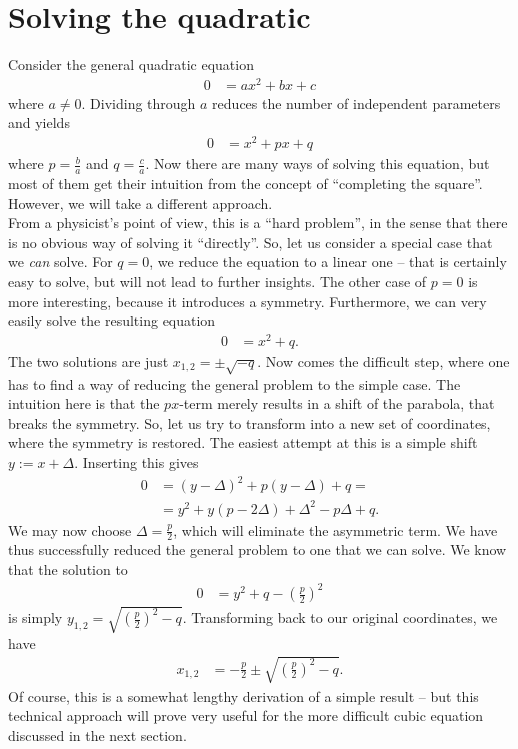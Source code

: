 \documentclass[english, parskip=full]{scrartcl}
\title{\titel}
\author{\autor}
\date{\today}
\newcommand{\kla}{}
\begin{document}
\maketitle  %

\section{Solving the quadratic}
Consider the general quadratic equation
\begin{align}
0 &= ax^2+bx+c
\end{align}
where $a\neq 0$.
Dividing through $a$ reduces the number of independent parameters and yields
\begin{align}
0 &= x^2 + px + q
\end{align} 
where $p=\frac{b}{a}$ and $q=\frac{c}{a}$.
Now there are many ways of solving this equation, but most of them get their intuition from the concept of ``completing the square''.
However, we will take a different approach.
\\
From a physicist's point of view, this is a ``hard problem'', in the sense that there is no obvious way of solving it ``directly''.
So, let us consider a special case that we \emph{can} solve.
For $q=0$, we reduce the equation to a linear one -- that is certainly easy to solve, but will not lead to further insights.
The other case of $p=0$ is more interesting, because it introduces a symmetry.
Furthermore, we can very easily solve the resulting equation
\begin{align}
0 &= x^2+q.
\end{align}
The two solutions are just $x_{1,2} = \pm \sqrt{-q}$.
Now comes the difficult step, where one has to find a way of reducing the general problem to the simple case.
The intuition here is that the $px$-term merely results in a shift of the parabola, that breaks the symmetry.
So, let us try to transform into a new set of coordinates, where the symmetry is restored.
The easiest attempt at this is a simple shift $y:=x+\Delta$.
Inserting this gives
\begin{align}
0 &= \kla\left( y-\Delta \right)^2 + p(y-\Delta) + q = \\
&= y^2 + y\kla\left( p - 2\Delta \right) + \Delta^2 - p\Delta + q.
\end{align}
We may now choose $\Delta = \frac{p}{2}$, which will eliminate the asymmetric term.
We have thus successfully reduced the general problem to one that we can solve.
We know that the solution to
\begin{align}
0 &= y^2 + q - \kla\left( \frac{p}{2} \right)^2
\end{align}
is simply $y_{1,2} = \sqrt{\kla\left( \frac{p}{2} \right)^2 - q}$.
Transforming back to our original coordinates, we have
\begin{align}
x_{1,2} &= -\frac{p}{2} \pm \sqrt{\kla\left( \frac{p}{2} \right)^2 - q}.
\end{align}
Of course, this is a somewhat lengthy derivation of a simple result -- but this technical approach will prove very useful for the more difficult cubic equation discussed in the next section.
\end{document}
